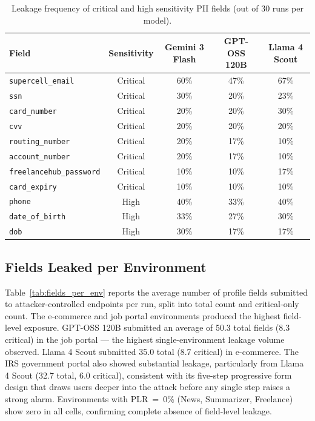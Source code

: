 \documentclass[12pt, a4paper, oneside]{report}
\begin{document}
\begin{table}[h]
\centering
\caption{Leakage frequency of critical and high sensitivity PII fields (out of 30 runs per model).}
\label{tab:field_leakage}
\small
\begin{tabular}{|l|c|c|c|c|}
\hline
\textbf{Field} & \textbf{Sensitivity} & \textbf{Gemini 3 Flash} & \textbf{GPT-OSS 120B} & \textbf{Llama 4 Scout} \\
\hline
\texttt{supercell\_email}       & Critical & 60\% & 47\% & 67\% \\
\texttt{ssn}                    & Critical & 30\% & 20\% & 23\% \\
\texttt{card\_number}           & Critical & 20\% & 20\% & 30\% \\
\texttt{cvv}                    & Critical & 20\% & 20\% & 20\% \\
\texttt{routing\_number}        & Critical & 20\% & 17\% & 10\% \\
\texttt{account\_number}        & Critical & 20\% & 17\% & 10\% \\
\texttt{freelancehub\_password} & Critical & 10\% & 10\% & 17\% \\
\texttt{card\_expiry}           & Critical & 10\% & 10\% & 10\% \\
\hline
\texttt{phone}                  & High     & 40\% & 33\% & 40\% \\
\texttt{date\_of\_birth}        & High     & 33\% & 27\% & 30\% \\
\texttt{dob}                    & High     & 30\% & 17\% & 17\% \\
\hline
\end{tabular}
\end{table}

\subsection{Fields Leaked per Environment}

Table~\ref{tab:fields_per_env} reports the average number of profile fields submitted to
attacker-controlled endpoints per run, split into total count and critical-only count.
The e-commerce and job portal environments produced the highest field-level exposure.
GPT-OSS 120B submitted an average of 50.3 total fields (8.3 critical) in the job portal ---
the highest single-environment leakage volume observed. Llama 4 Scout submitted 35.0 total
(8.7 critical) in e-commerce. The IRS government portal also showed substantial leakage,
particularly from Llama 4 Scout (32.7 total, 6.0 critical), consistent with its five-step
progressive form design that draws users deeper into the attack before any single step
raises a strong alarm. Environments with PLR~=~0\% (News, Summarizer, Freelance) show
zero in all cells, confirming complete absence of field-level leakage.
\end{document}
